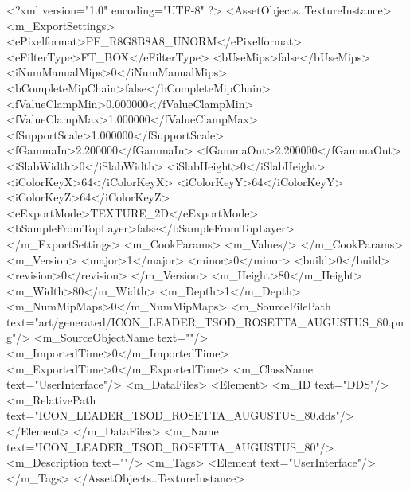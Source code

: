 <?xml version="1.0" encoding="UTF-8" ?>
<AssetObjects..TextureInstance>
	<m_ExportSettings>
		<ePixelformat>PF_R8G8B8A8_UNORM</ePixelformat>
		<eFilterType>FT_BOX</eFilterType>
		<bUseMips>false</bUseMips>
		<iNumManualMips>0</iNumManualMips>
		<bCompleteMipChain>false</bCompleteMipChain>
		<fValueClampMin>0.000000</fValueClampMin>
		<fValueClampMax>1.000000</fValueClampMax>
		<fSupportScale>1.000000</fSupportScale>
		<fGammaIn>2.200000</fGammaIn>
		<fGammaOut>2.200000</fGammaOut>
		<iSlabWidth>0</iSlabWidth>
		<iSlabHeight>0</iSlabHeight>
		<iColorKeyX>64</iColorKeyX>
		<iColorKeyY>64</iColorKeyY>
		<iColorKeyZ>64</iColorKeyZ>
		<eExportMode>TEXTURE_2D</eExportMode>
		<bSampleFromTopLayer>false</bSampleFromTopLayer>
	</m_ExportSettings>
	<m_CookParams>
		<m_Values/>
	</m_CookParams>
	<m_Version>
		<major>1</major>
		<minor>0</minor>
		<build>0</build>
		<revision>0</revision>
	</m_Version>
	<m_Height>80</m_Height>
	<m_Width>80</m_Width>
	<m_Depth>1</m_Depth>
	<m_NumMipMaps>0</m_NumMipMaps>
	<m_SourceFilePath text="art/generated/ICON_LEADER_TSOD_ROSETTA_AUGUSTUS_80.png"/>
	<m_SourceObjectName text=""/>
	<m_ImportedTime>0</m_ImportedTime>
	<m_ExportedTime>0</m_ExportedTime>
	<m_ClassName text="UserInterface"/>
	<m_DataFiles>
		<Element>
			<m_ID text="DDS"/>
			<m_RelativePath text="ICON_LEADER_TSOD_ROSETTA_AUGUSTUS_80.dds"/>
		</Element>
	</m_DataFiles>
	<m_Name text="ICON_LEADER_TSOD_ROSETTA_AUGUSTUS_80"/>
	<m_Description text=""/>
	<m_Tags>
		<Element text="UserInterface"/>
	</m_Tags>
</AssetObjects..TextureInstance>
